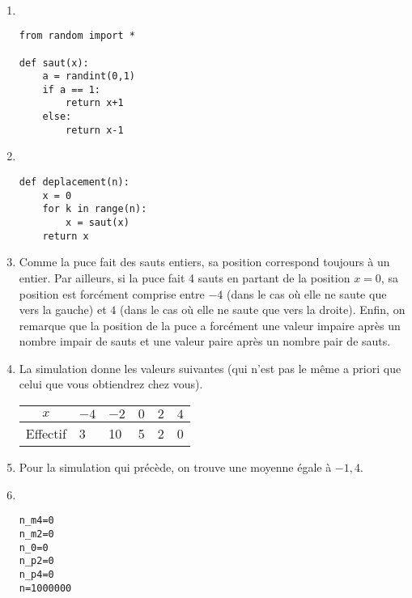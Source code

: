 \begin{correction}~
\begin{enumerate}
\item ~
		\begin{center}
			\begin{varwidth}[t]{.5\textwidth}
				\begin{lstlisting}[language=iPython,linewidth = 6cm]
from random import *

def saut(x):
    a = randint(0,1)
    if a == 1:
        return x+1
    else:
        return x-1\end{lstlisting}\end{varwidth}\end{center}
\item ~
		\begin{center}
			\begin{varwidth}[t]{.5\textwidth}
				\begin{lstlisting}[language=iPython,linewidth = 6cm]
def deplacement(n):
    x = 0
    for k in range(n):
        x = saut(x)
    return x\end{lstlisting}\end{varwidth}\end{center}
\item Comme la puce fait des sauts entiers, sa position correspond toujours à un entier. Par ailleurs, si la puce fait 4 sauts en partant de la position $x=0$, sa position est forcément comprise entre $-4$ (dans le cas où elle ne saute que vers la gauche) et $4$ (dans le cas où elle ne saute que vers la droite). Enfin, on remarque que la position de la puce a forcément une valeur impaire après un nombre impair de sauts et une valeur paire après un nombre pair de sauts.
\item La simulation donne les valeurs suivantes (qui n'est pas le même a priori que celui que vous obtiendrez chez vous).
\begin{center}
	\begin{tabular}{|c|C{1cm}|C{1cm}|C{1cm}|C{1cm}|C{1cm}|}
		\hline
		$x$ & $-4$ & $-2$ & $0$ & $2$ & $4$ \\\hline
		Effectif & 3 & 10 & 5 & 2 & 0 \\\hline
	\end{tabular}
\end{center}
\item Pour la simulation qui précède, on trouve une moyenne égale à $-1,4$.
\item ~
\begin{center}
	\begin{varwidth}[t]{.5\textwidth}
		\begin{lstlisting}[language=iPython,linewidth = 12cm]
n_m4=0
n_m2=0
n_0=0
n_p2=0
n_p4=0
n=1000000


\end{lstlisting}
\end{varwidth}
\end{center}
\end{enumerate}
\end{correction}
